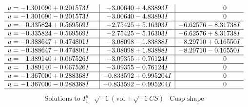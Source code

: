 \documentclass[1p]{elsarticle_modified}
\theoremstyle{definition}
\newcommand{\I}{\sqrt{-1}}
\begin{document}
$$\begin{array}{c|c|c}
\begin{aligned}
u &= -1.301090 + 0.201573 I\end{aligned}
 & -3.00640 + 4.83893 I & \phantom{-0.000000 } 0 \\ \hline\begin{aligned}
u &= -1.301090 - 0.201573 I\end{aligned}
 & -3.00640 - 4.83893 I & \phantom{-0.000000 } 0 \\ \hline\begin{aligned}
u &= -0.335824 + 0.569569 I\end{aligned}
 & -2.75425 + 5.16303 I & -6.62576 - 8.31738 I \\ \hline\begin{aligned}
u &= -0.335824 - 0.569569 I\end{aligned}
 & -2.75425 - 5.16303 I & -6.62576 + 8.31738 I \\ \hline\begin{aligned}
u &= -0.388647 + 0.474801 I\end{aligned}
 & -3.08098 - 1.83888 I & -8.29710 + 0.16550 I \\ \hline\begin{aligned}
u &= -0.388647 - 0.474801 I\end{aligned}
 & -3.08098 + 1.83888 I & -8.29710 - 0.16550 I \\ \hline\begin{aligned}
u &= \phantom{-}1.389140 + 0.067526 I\end{aligned}
 & -3.09355 + 0.76124 I & \phantom{-0.000000 } 0 \\ \hline\begin{aligned}
u &= \phantom{-}1.389140 - 0.067526 I\end{aligned}
 & -3.09355 - 0.76124 I & \phantom{-0.000000 } 0 \\ \hline\begin{aligned}
u &= -1.367000 + 0.288368 I\end{aligned}
 & -0.833592 + 0.995204 I & \phantom{-0.000000 } 0 \\ \hline\begin{aligned}
u &= -1.367000 - 0.288368 I\end{aligned}
 & -0.833592 - 0.995204 I & \phantom{-0.000000 } 0\\
 \hline 
 \end{array}$$\newpage$$\begin{array}{c|c|c}  
\text{Solutions to }I^u_{1}& \I (\text{vol} + \sqrt{-1}CS) & \text{Cusp shape}\\
 \hline 
\begin{aligned}

\end{aligned}
\end{array}$$
\end{document}
